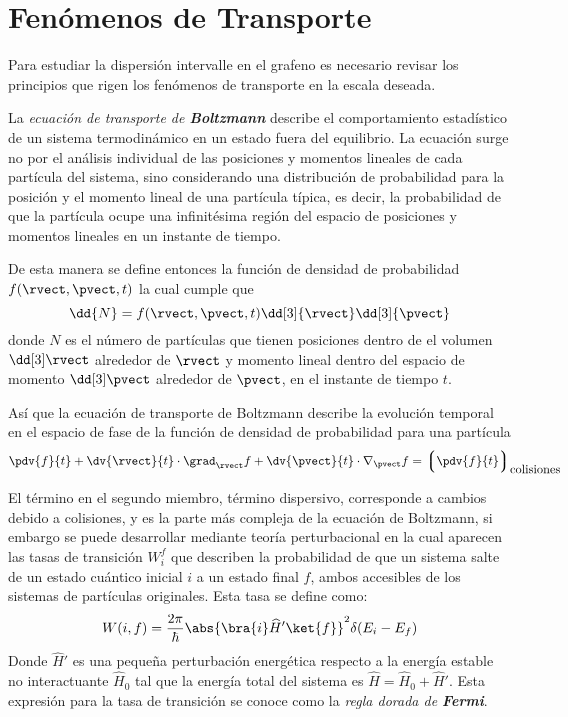 \section{Fenómenos de Transporte}

Para estudiar la dispersión intervalle en el grafeno es necesario revisar los 
principios que rigen los fenómenos de transporte en la escala deseada.

La \emph{ecuación de transporte de \textbf{Boltzmann}} describe el comportamiento estadístico de un sistema termodinámico en un estado fuera del equilibrio. La ecuación surge no por el análisis individual de las posiciones y momentos lineales de cada partícula del sistema, sino considerando una distribución de probabilidad para la posición y el momento lineal de una partícula típica, es decir, la probabilidad de que la partícula ocupe una infinitésima región del espacio de posiciones y momentos lineales en un instante de tiempo.

De esta manera se define entonces la función de densidad de probabilidad $ f(\rvect, \pvect, t) $ la cual cumple que 
\begin{equation}\label{eq:densityDistributionFunction}
\dd{N}  = f(\rvect, \pvect, t) \dd[3]{\rvect} \dd[3]{\pvect}
\end{equation}
donde $ N $ es el número de partículas que tienen posiciones dentro de el volumen $ \dd[3]\rvect $ alrededor de $ \rvect $ y momento lineal dentro del espacio de momento $ \dd[3]\pvect $ alrededor de $ \pvect $, en el instante de tiempo $ t $.

Así que la ecuación de transporte de Boltzmann describe la evolución temporal en el espacio de fase de la función de densidad de probabilidad para una partícula
\begin{equation}\label{eq:BTE}
\pdv{f}{t} + \dv{\rvect}{t} \cdot \grad_{\rvect}{f} + \dv{\pvect}{t} \cdot \nabla_{\pvect}{f} = \left\lgroup \pdv{f}{t} \right\rgroup_{\rlap{colisiones}}
\end{equation} 

El término en el segundo miembro, término dispersivo, corresponde a cambios debido a colisiones, y es la parte más compleja de la ecuación de Boltzmann, si embargo se puede desarrollar mediante teoría perturbacional en la cual aparecen las tasas de transición $ W_i^f $ que describen la probabilidad de que un sistema salte de un estado cuántico inicial $ i $ a un estado final $ f $, ambos accesibles de los sistemas de partículas originales. Esta tasa se define como:
\begin{equation}\label{eq:goldenRule}
W(i, f) = \frac{2\pi}{\hbar} \abs{\bra{i}\widehat{H}'\ket{f}}^2 \delta(E_i - E_f)
\end{equation}
Donde $ \widehat{H}' $ es una pequeña perturbación energética respecto a la energía estable no interactuante $ \widehat{H}_0 $ tal que la energía total del sistema es $ \widehat{H} = \widehat{H}_0 + \widehat{H}' $. Esta expresión para la tasa de transición se conoce como la \emph{regla dorada de \textbf{Fermi}}.

